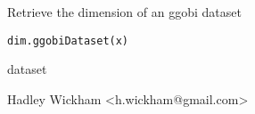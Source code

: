 \begin{Description}\relax
Retrieve the dimension of an ggobi dataset
\end{Description}
\begin{Usage}
\begin{verbatim}dim.ggobiDataset(x)\end{verbatim}
\end{Usage}
\begin{Arguments}
\begin{ldescription}
\item[\code{x}] dataset
\end{ldescription}
\end{Arguments}
\begin{Details}\relax
\end{Details}
\begin{Author}\relax
Hadley Wickham <h.wickham@gmail.com>
\end{Author}
\begin{Examples}
\begin{ExampleCode}\end{ExampleCode}
\end{Examples}

